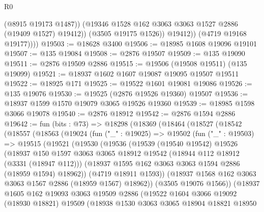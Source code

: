 \begin{lexlean}{R0}
\begin{coremodule}
                    (@8915 @19173 @1487))
                  (@19346 @1528 @162 @3063 @3063 @1527 @2886 (@19409 @1527) @19412))
                (@3505 @19175 @1526))
              @19412))
          (@4719 @19168 @19177))))
@19503 := @18628 @3400
@19506 := @18985 @1608 @19096 @19101
@19507 := @135 @19084
@19508 := @2876 @19507
@19509 := @135 @19090
@19511 := @2876 @19509 @2886
@19515 := @19506 (@19508 @19511) (@135 @19099)
@19521 := @18937 @1602 @1607 @19087 @19095 @19507 @19511
@19522 := @18925 @171
@19525 := @19522 @1601 @19081 @19086
@19526 := @135 @19076
@19530 := @19525 (@2876 @19526 @19360) @19507
@19536 := @18937 @1599 @1570 @19079 @3065 @19526 @19360
@19539 := @18985 @1598 @3066 @19078
@19540 := @2876 @18912
@19542 := @2876 @1594 @2886
@19642 := fun (bits : @73) =>
  @18298
    (@18369
      (@18464
        (@18527
          (@18542
            (@18557
              (@18563
                (@19024
                  (fun ("_" : @19025) =>
                  @19502
                    (fun ("_" : @19503) =>
                    @19515
                      (@19521
                        (@19530
                          (@19536
                            (@19539
                              (@19540 @19542)
                              @19526
                              (@18937
                                @150
                                @1597
                                @3063
                                @3065
                                @18912
                                @19542
                                (@18944 @112 @18912 (@3331 (@18947 @112)))
                                (@18937 @1595 @162 @3063 @3063 @1594 @2886 (@18959 @1594) @18962))
                              (@4719 @18911 @1593))
                            (@18937 @1568 @162 @3063 @3063 @1567 @2886 (@18959 @1567) @18962))
                          (@3505 @19076 @1566))
                        (@18937
                          @1605
                          @162
                          @19093
                          @3063
                          @19509
                          @2886
                          (@19522
                            @1604
                            @3066
                            @19092
                            (@18930 @18821)
                            @19509
                            (@18938
                              @1530
                              @3063
                              @3065
                              @18904
                              @18821
                              @18950

\end{coremodule}
\end{lexlean}
